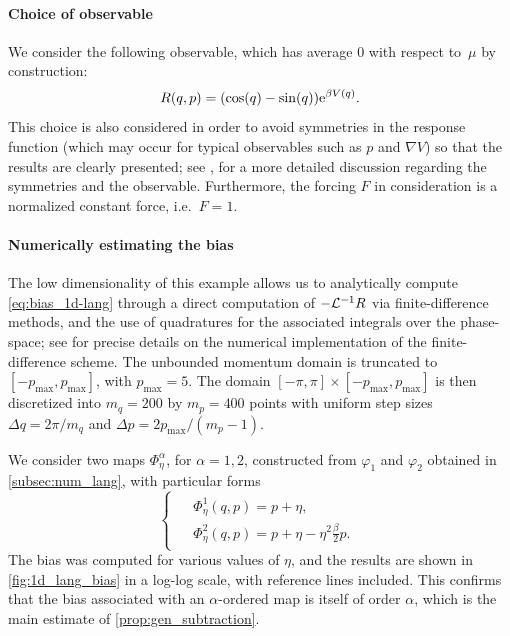\paragraph{Choice of observable} We consider the following observable, which has average 0 with respect to~$\mu$ by construction: 
%
\begin{equation}
	R(q,p) = \paren*{\cos(q) - \sin(q)} \e^{\beta V(q)}.
	\label{eq:R_observable}
\end{equation}
%
This choice is also considered in order to avoid symmetries in the response function (which may occur for typical observables such as $p$ and $\nabla V$) so that the results are clearly presented; see \cite[Section~4.2]{spacek2023}, for a more detailed discussion regarding the symmetries and the observable. Furthermore, the forcing $F$ in consideration is a normalized constant force, i.e.\ $F = 1$.

\paragraph{Numerically estimating the bias} The low dimensionality of this example allows us to analytically compute \eqref{eq:bias_1d-lang} through a direct computation of $-\mathcal{L}^{-1}R$ via finite-difference methods, and the use of quadratures for the associated integrals over the phase-space; see \cite[Appendix B]{spacek2023} for precise details on the numerical implementation of the finite-difference scheme. The unbounded momentum domain is truncated to $[-p_\mathrm{max},p_\mathrm{max}]$, with $p_\mathrm{max} = 5$. The domain $[-\pi,\pi] \times [-p_\mathrm{max},p_\mathrm{max}]$ is then discretized into $m_q = 200$ by $m_p = 400$ points with uniform step sizes $\Delta q = 2\pi/m_q$ and $\Delta p = 2p_\mathrm{max}/(m_p-1)$. 

We consider two maps $\Phi_\eta^\alpha$, for $\alpha=1,2$, constructed from $\varphi_1$ and $\varphi_2$ obtained in \cref{subsec:num_lang}, with particular forms
%
\begin{equation}
\begin{cases}
\begin{aligned}
	&\Phi_\eta^1(q,p) = p + \eta, \\
	&\Phi_\eta^2(q,p) = p + \eta - \eta^2\frac{\beta}{2}p.
\end{aligned}
\end{cases}
\end{equation}
%
The bias was computed for various values of $\eta$, and the results are shown in \cref{fig:1d_lang_bias} in a log-log scale, with reference lines included. This confirms that the bias associated with an $\alpha$-ordered map is itself of order $\alpha$, which is the main estimate of \cref{prop:gen_subtraction}.

